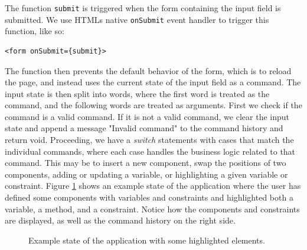 \documentclass[11pt, a4paper]{article}
\begin{document}
The function \texttt{submit} is triggered when the form containing the input field is submitted. We use HTMLs native \texttt{onSubmit} event handler to trigger this function, like so:

\begin{verbatim}
<form onSubmit={submit}>
\end{verbatim}

The function then prevents the default behavior of the form, which is to reload the page, and instead uses the current state of the input field as a command. The input state is then split into words, where the first word is treated as the command, and the following words are treated as arguments. First we check if the command is a valid command. If it is not a valid command, we clear the input state and append a message "Invalid command" to the command history and return void. Proceeding, we have a \textit{switch} statements with cases that match the individual commands, where each case handles the business logic related to that command. This may be to insert a new component, swap the positions of two components, adding or updating a variable, or highlighting a given variable or constraint. Figure \ref{fig:example} shows an example state of the application where the user has defined some components with variables and constraints and highlighted both a variable, a method, and a constraint. Notice how the components and constraints are displayed, as well as the command history on the right side.

\begin{figure}[h]
    \centering
    \caption{Example state of the application with some highlighted elements.}
    \label{fig:example}
\end{figure}
\end{document}
